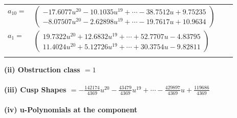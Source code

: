 \documentclass[1p]{elsarticle_modified}
\theoremstyle{definition}
\begin{document}
\begin{tabular}{m{7pt} m{180pt} m{7pt} m{180pt} }
\flushright $a_{10}=$&$\begin{pmatrix}-17.6077 u^{20}-10.1035 u^{19}+\cdots-38.7512 u+9.75235\\-8.07507 u^{20}-2.62898 u^{19}+\cdots-19.7617 u+10.9634\end{pmatrix}$ \\
\flushright $a_{1}=$&$\begin{pmatrix}19.7322 u^{20}+12.6832 u^{19}+\cdots+52.7707 u-4.83795\\11.4024 u^{20}+5.12726 u^{19}+\cdots+30.3754 u-9.82811\end{pmatrix}$\\&\end{tabular}
\flushleft \textbf{(ii) Obstruction class $= 1$}\\~\\
\flushleft \textbf{(iii) Cusp Shapes $= -\frac{142174}{4369} u^{20}-\frac{43479}{4369} u^{19}+\cdots-\frac{429897}{4369} u+\frac{119686}{4369}$}\\~\\
\newpage\renewcommand{\arraystretch}{1}
\flushleft \textbf{(iv) u-Polynomials at the component}\newline \\
\end{document}
